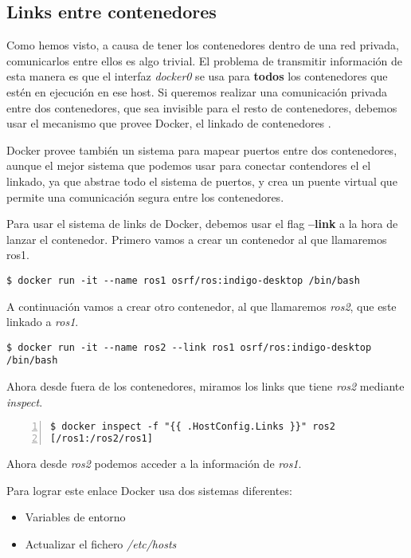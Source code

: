 		\subsection{Links entre contenedores}
		Como hemos visto, a causa de tener los contenedores dentro de una red privada, comunicarlos entre ellos es algo trivial. El problema de transmitir información de esta manera es que el interfaz \emph{docker0} se usa para \textbf{todos} los contenedores que estén en ejecución en ese host. Si queremos realizar una comunicación privada entre dos contenedores, que sea invisible para el resto de contenedores, debemos usar el mecanismo que provee Docker, el linkado de contenedores \cite{docker-network-linking}.
		
		Docker provee también un sistema para mapear puertos entre dos contenedores, aunque el mejor sistema que podemos usar para conectar contendores el el linkado, ya que abstrae todo el sistema de puertos, y crea un puente virtual que permite una comunicación segura entre los contenedores.
		
		Para usar el sistema de links de Docker, debemos usar el flag \textbf{--link} a la hora de lanzar el contenedor. Primero vamos a crear un contenedor al que llamaremos ros1.
		
		\begin{lstlisting}[style=consola]
$ docker run -it --name ros1 osrf/ros:indigo-desktop /bin/bash
		\end{lstlisting}
		
		A continuación vamos a crear otro contenedor, al que llamaremos \emph{ros2}, que este linkado a \emph{ros1}.
		
		\begin{lstlisting}[style=consola]
$ docker run -it --name ros2 --link ros1 osrf/ros:indigo-desktop /bin/bash
		\end{lstlisting}
		
		Ahora desde fuera de los contenedores, miramos los links que tiene \emph{ros2} mediante \emph{inspect}.
		
		\begin{lstlisting}[style=consola,numbers=left]
$ docker inspect -f "{{ .HostConfig.Links }}" ros2
[/ros1:/ros2/ros1]
		\end{lstlisting}
		
		Ahora desde \emph{ros2} podemos acceder a la información de \emph{ros1}.
		
		Para lograr este enlace Docker usa dos sistemas diferentes:
		
		\begin{itemize}
			\item Variables de entorno
			\item Actualizar el fichero \emph{/etc/hosts}
		\end{itemize}
		
